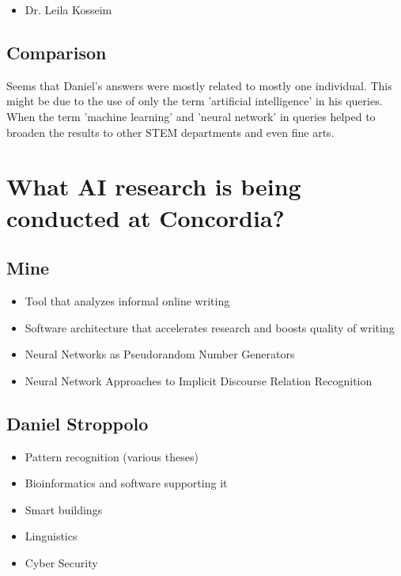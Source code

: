 \begin{itemize}
    \item Dr. Leila Kosseim
\end{itemize}

\subsection{Comparison}

\par Seems that Daniel's answers were mostly related to mostly one individual. This might be due to the use of only the term 'artificial intelligence' in his queries. When the term 'machine learning' and 'neural network' in queries helped to broaden the results to other STEM departments and even fine arts. 

\section{What AI research is being conducted at Concordia?}

\subsection{Mine}

\begin{itemize}
    \item Tool that analyzes informal online writing
    \item Software architecture that accelerates research and boosts quality of writing
    \item Neural Networks as Pseudorandom Number Generators
    \item Neural Network Approaches to Implicit Discourse Relation Recognition
\end{itemize}

\subsection{Daniel Stroppolo}

\begin{itemize}
    \item Pattern recognition (various theses)
    \item Bioinformatics and software supporting it
    \item Smart buildings
    \item Linguistics
    \item Cyber Security
\end{itemize}

